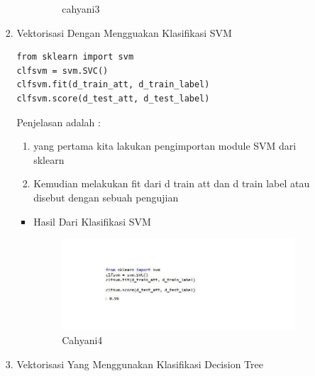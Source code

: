\begin{enumerate}
\begin{itemize}
\begin{enumerate}
\begin{itemize}
\begin{figure}[!hbtp]
\caption{cahyani3}
\label{cahyani3}
\end{figure}
\par
\par
\par
\end{itemize}
\par
\par
\item Vektorisasi Dengan Mengguakan Klasifikasi SVM
\par
\begin{lstlisting}
from sklearn import svm
clfsvm = svm.SVC()
clfsvm.fit(d_train_att, d_train_label)
clfsvm.score(d_test_att, d_test_label)
\end{lstlisting}
\par Penjelasan adalah :
\begin{enumerate}
\item yang pertama kita lakukan pengimportan module SVM dari sklearn
\item Kemudian melakukan fit dari d train att dan d train label atau disebut dengan sebuah  pengujian
\end{enumerate}
\par
\begin{itemize}
\item Hasil Dari Klasifikasi SVM
\begin{figure}[!hbtp]
\centering
\includegraphics[scale=0.3]{figures/Cahyani4.jpg}
\caption{Cahyani4}
\label{Cahyani4}
\end{figure}
\par
\par
\par
\end{itemize}
\par
\par
\par
\item Vektorisasi Yang Menggunakan Klasifikasi Decision Tree
\par
\begin{lstlisting}

\end{lstlisting}
\end{enumerate}
\end{itemize}
\end{enumerate}
